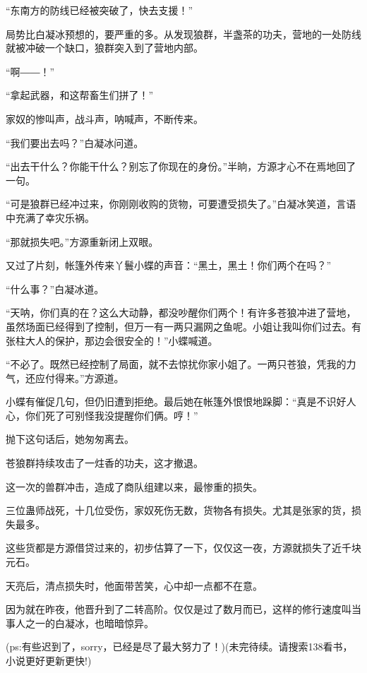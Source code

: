 \begin{this_body}
“东南方的防线已经被突破了，快去支援！”

局势比白凝冰预想的，要严重的多。从发现狼群，半盏茶的功夫，营地的一处防线就被冲破一个缺口，狼群突入到了营地内部。

“啊――！”

“拿起武器，和这帮畜生们拼了！”

家奴的惨叫声，战斗声，呐喊声，不断传来。

“我们要出去吗？”白凝冰问道。

“出去干什么？你能干什么？别忘了你现在的身份。”半晌，方源才心不在焉地回了一句。

“可是狼群已经冲过来，你刚刚收购的货物，可要遭受损失了。”白凝冰笑道，言语中充满了幸灾乐祸。

“那就损失吧。”方源重新闭上双眼。

又过了片刻，帐篷外传来丫鬟小蝶的声音：“黑土，黑土！你们两个在吗？”

“什么事？”白凝冰道。

“天呐，你们真的在？这么大动静，都没吵醒你们两个！有许多苍狼冲进了营地，虽然场面已经得到了控制，但万一有一两只漏网之鱼呢。小姐让我叫你们过去。有张柱大人的保护，那边会很安全的！”小蝶喊道。

“不必了。既然已经控制了局面，就不去惊扰你家小姐了。一两只苍狼，凭我的力气，还应付得来。”方源道。

小蝶有催促几句，但仍旧遭到拒绝。最后她在帐篷外恨恨地跺脚：“真是不识好人心，你们死了可别怪我没提醒你们俩。哼！”

抛下这句话后，她匆匆离去。

苍狼群持续攻击了一炷香的功夫，这才撤退。

这一次的兽群冲击，造成了商队组建以来，最惨重的损失。

三位蛊师战死，十几位受伤，家奴死伤无数，货物各有损失。尤其是张家的货，损失最多。

这些货都是方源借贷过来的，初步估算了一下，仅仅这一夜，方源就损失了近千块元石。

天亮后，清点损失时，他面带苦笑，心中却一点都不在意。

因为就在昨夜，他晋升到了二转高阶。仅仅是过了数月而已，这样的修行速度叫当事人之一的白凝冰，也暗暗惊异。

(ps:有些迟到了，sorry，已经是尽了最大努力了！)(未完待续。请搜索138看书，小说更好更新更快!)

\end{this_body}

